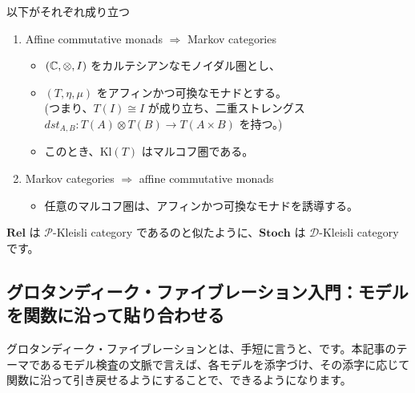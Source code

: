 \documentclass[
		head_space=20mm,
		foot_space=20mm,
		gutter=10mm,
		line_length=190mm
]{jlreq}
\begin{document}
\begin{theorem}[モナドとマルコフ圏の関係]
	以下がそれぞれ成り立つ
	\begin{enumerate}
		\item Affine commutative monads $\Rightarrow$ Markov categories
		\begin{itemize}
			\item $(\mathbb{C},\otimes,I)$ をカルテシアンなモノイダル圏とし、
			\item $(T,\eta,\mu)$ をアフィンかつ可換なモナドとする。\\ (つまり、$T(I)\cong I$ が成り立ち、二重ストレングス $dst_{A,B}\colon T(A)\otimes T(B)\to T(A\times B)$ を持つ。)
			\item このとき、$\mathrm{Kl}(T)$ はマルコフ圏である。
		\end{itemize}
		\item Markov categories $\Rightarrow$ affine commutative monads
		\begin{itemize}
			\item 任意のマルコフ圏は、アフィンかつ可換なモナドを誘導する。
		\end{itemize}
	\end{enumerate}
\end{theorem}

\clearpage

\noindent $\mathbf{Rel}$ は $\mathcal P$-Kleisli category であるのと似たように、$\mathbf{Stoch}$ は $\mathcal D$-Kleisli category です。


\clearpage

\subsection{グロタンディーク・ファイブレーション入門：モデルを関数に沿って貼り合わせる}


グロタンディーク・ファイブレーションとは、手短に言うと、です。本記事のテーマであるモデル検査の文脈で言えば、各モデルを添字づけ、その添字に応じて関数に沿って引き戻せるようにすることで、できるようになります。%
\end{document}
